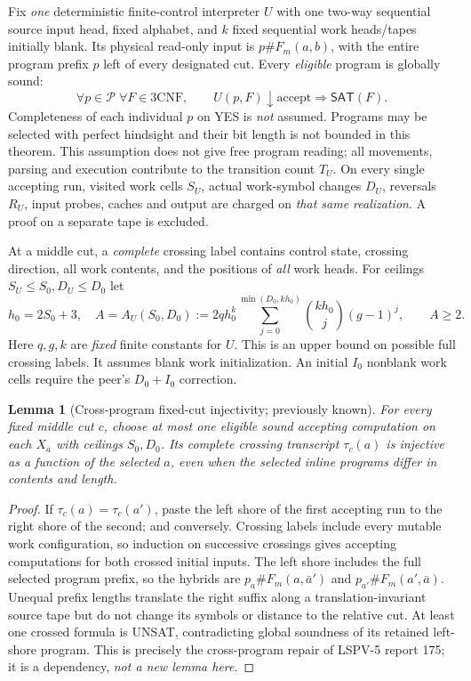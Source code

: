 \documentclass[11pt]{article}
\newtheorem{lemma}[theorem]{Lemma}
\newcommand{\SAT}{\mathsf{SAT}}
\begin{document}
Fix \emph{one} deterministic finite-control interpreter $U$
with one two-way sequential source input head, fixed alphabet,
and $k$ fixed sequential work heads/tapes initially blank.
Its physical read-only input is $p\#F_m(a,b)$, with the
entire program prefix $p$ left of every designated cut.
Every \emph{eligible} program is globally sound:
\[
\forall p\in\mathcal P\;\forall F\in\mathrm{3CNF},\qquad
 U(p,F)\downarrow\mathrm{accept}\Longrightarrow\SAT(F).
\]
Completeness of each individual $p$ on YES is \emph{not}
assumed. Programs may be selected with perfect hindsight and
their bit length is not bounded in this theorem. This
assumption does not give free program reading; all movements,
parsing and execution contribute to the transition count
$T_U$. On every single accepting run, visited work cells
$S_U$, actual work-symbol changes $D_U$, reversals $R_U$,
input probes, caches and output are charged on \emph{that
same realization}. A proof on a separate tape is excluded.

At a middle cut, a \emph{complete} crossing label contains
control state, crossing direction, all work contents, and
the positions of \emph{all} work heads. For ceilings
$S_U\le S_0,D_U\le D_0$ let
\[
 h_0=2S_0+3,\quad
 A=A_U(S_0,D_0):=
 2q h_0^k
 \sum_{j=0}^{\min(D_0,kh_0)}
 {kh_0\choose j}(g-1)^j,\qquad A\ge2.       \tag{1}
\]
Here $q,g,k$ are \emph{fixed} finite constants for $U$.
This is an upper bound on possible full crossing labels.
It assumes blank work initialization. An initial $I_0$
nonblank work cells require the peer's $D_0+I_0$ correction.

\begin{lemma}[Cross-program fixed-cut injectivity; previously known]
\label{lem:splice}
For every fixed middle cut $c$, choose \emph{at most one}
eligible sound accepting computation on each $X_a$ with
ceilings $S_0,D_0$. Its complete crossing transcript
$\tau_c(a)$ is injective as a function of the selected $a$,
even when the selected inline programs differ in contents
and length.
\end{lemma}
\begin{proof}
If $\tau_c(a)=\tau_c(a')$, paste the left shore of
the first accepting run to the right shore of the second;
and conversely. Crossing labels include every mutable
work configuration, so induction on successive crossings
gives accepting computations for both crossed initial
inputs. The left shore includes the full selected program
prefix, so the hybrids are
$p_a\#F_m(a,\bar a')$ and
$p_{a'}\#F_m(a',\bar a)$.
Unequal prefix lengths translate the right suffix along
a translation-invariant source tape but do not change
its symbols or distance to the relative cut. At least
one crossed formula is UNSAT, contradicting global
soundness of its retained left-shore program.
This is precisely the cross-program repair of
LSPV-5 report 175; it is a dependency, \emph{not
a new lemma here}.
\end{proof}
\end{document}
